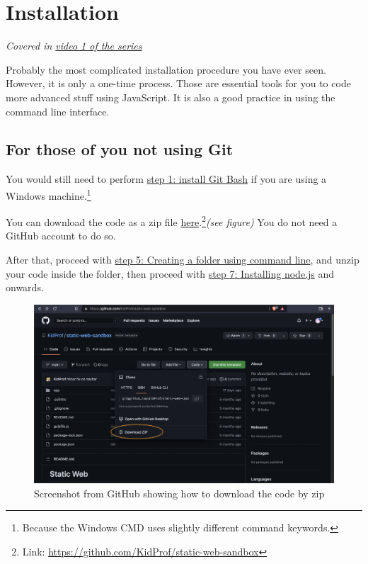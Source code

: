 \chapter{Installation}

\textit{Covered in \href{https://www.youtube.com/watch?v=oIsH0V3fRt8&list=PLjGmdnqrOKuYXiu7lgG5HW71jPEUd1XCm&index=2}{video 1 of the series}}
\vspace{6mm}

Probably the most complicated installation procedure you have ever seen. However, it is only a one-time process. Those are essential tools for you to code more advanced stuff using JavaScript. It is also a good practice in using the command line interface.

\section*{For those of you not using Git}

You would still need to perform \hyperref[sec:install1]{step 1: install Git Bash} if you are using a Windows machine.\footnote{Because the Windows CMD uses slightly different command keywords.}

You can download the code as a zip file \href{https://github.com/KidProf/static-web-sandbox}{here}.\footnote{Link: \url{https://github.com/KidProf/static-web-sandbox}}\textit{(see figure)} You do not need a GitHub account to do so. 

After that, proceed with \hyperref[sec:install5]{step 5: Creating a folder using command line}, and unzip your code inside the folder, then proceed with \hyperref[sec:install7]{step 7: Installing node.js} and onwards.

\begin{figure}[h]
\centering
\includegraphics[width=15cm]{images/ch1-download-as-zip.png}
\caption{Screenshot from GitHub showing how to download the code by zip}
\end{figure}

